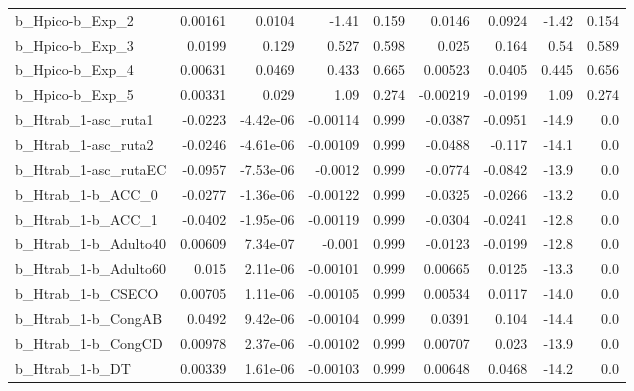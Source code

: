 \begin{tabular}{lrrrrrrrr}
b\_Hpico-b\_Exp\_2            &     0.00161 &       0.0104 &    -1.41 &    0.159 &     0.0146 &      0.0924 &        -1.42 &         0.154 \\
b\_Hpico-b\_Exp\_3            &      0.0199 &        0.129 &    0.527 &    0.598 &      0.025 &       0.164 &         0.54 &         0.589 \\
b\_Hpico-b\_Exp\_4            &     0.00631 &       0.0469 &    0.433 &    0.665 &    0.00523 &      0.0405 &        0.445 &         0.656 \\
b\_Hpico-b\_Exp\_5            &     0.00331 &        0.029 &     1.09 &    0.274 &   -0.00219 &     -0.0199 &         1.09 &         0.274 \\
b\_Htrab\_1-asc\_ruta1        &     -0.0223 &    -4.42e-06 & -0.00114 &    0.999 &    -0.0387 &     -0.0951 &        -14.9 &           0.0 \\
b\_Htrab\_1-asc\_ruta2        &     -0.0246 &    -4.61e-06 & -0.00109 &    0.999 &    -0.0488 &      -0.117 &        -14.1 &           0.0 \\
b\_Htrab\_1-asc\_rutaEC       &     -0.0957 &    -7.53e-06 &  -0.0012 &    0.999 &    -0.0774 &     -0.0842 &        -13.9 &           0.0 \\
b\_Htrab\_1-b\_ACC\_0          &     -0.0277 &    -1.36e-06 & -0.00122 &    0.999 &    -0.0325 &     -0.0266 &        -13.2 &           0.0 \\
b\_Htrab\_1-b\_ACC\_1          &     -0.0402 &    -1.95e-06 & -0.00119 &    0.999 &    -0.0304 &     -0.0241 &        -12.8 &           0.0 \\
b\_Htrab\_1-b\_Adulto40       &     0.00609 &     7.34e-07 &   -0.001 &    0.999 &    -0.0123 &     -0.0199 &        -12.8 &           0.0 \\
b\_Htrab\_1-b\_Adulto60       &       0.015 &     2.11e-06 & -0.00101 &    0.999 &    0.00665 &      0.0125 &        -13.3 &           0.0 \\
b\_Htrab\_1-b\_CSECO          &     0.00705 &     1.11e-06 & -0.00105 &    0.999 &    0.00534 &      0.0117 &        -14.0 &           0.0 \\
b\_Htrab\_1-b\_CongAB         &      0.0492 &     9.42e-06 & -0.00104 &    0.999 &     0.0391 &       0.104 &        -14.4 &           0.0 \\
b\_Htrab\_1-b\_CongCD         &     0.00978 &     2.37e-06 & -0.00102 &    0.999 &    0.00707 &       0.023 &        -13.9 &           0.0 \\
b\_Htrab\_1-b\_DT             &     0.00339 &     1.61e-06 & -0.00103 &    0.999 &    0.00648 &      0.0468 &        -14.2 &           0.0 \\

\end{tabular}
